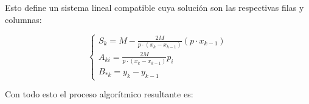 \begin{aportacionOriginal}
Esto define un sistema lineal compatible
cuya solución son las respectivas filas y columnas: 

\begin{equation}
    \left\{ 
        \begin{array}{l}
            S_{k} = M -  \frac{2 M}{p \cdot (x_k - x_{k-1})}(p \cdot x_{k-1})\\
            A_{k i} = \frac{2 M}{p \cdot (x_k - x_{k-1})}
            p_{i}  
            \\
            B_{* k} = y_k - y_{k-1}
        \end{array}
    \right.
\end{equation}  
\end{aportacionOriginal} %

Con todo esto el proceso algorítmico resultante es: 

